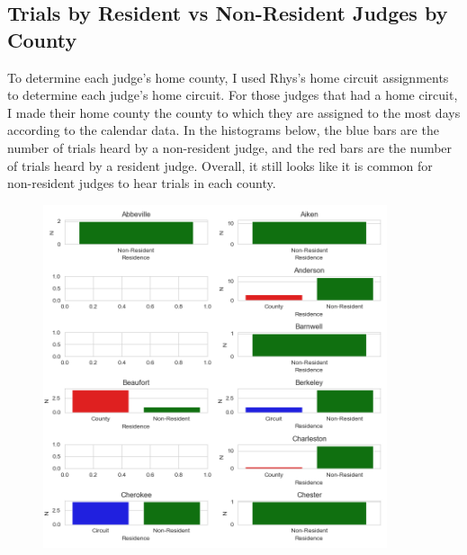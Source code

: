 \documentclass[11pt]{article}
\begin{document}
  \subsection{Trials by Resident vs Non-Resident Judges by County}
    To determine each judge's home county, I used Rhys's home circuit assignments to determine each judge's home circuit. For those judges that had a home circuit, I made their home county the county to which they are assigned to the most days according to the calendar data. In the histograms below, the blue bars are the number of trials heard by a non-resident judge, and the red bars are the number of trials heard by a resident judge.  Overall, it still looks like it is common for non-resident judges to hear trials in each county.
      \begin{figure}[H]
        \centering
        \includegraphics[width=0.9\textwidth]{../../../output/figures/Exploration/county_trial_hist_0.png}
      \end{figure}
\end{document}
